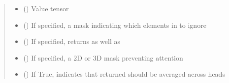 \documentclass[letterpaper,10pt,english]{sphinxmanual}
\begin{document}
\begin{fulllineitems}
\begin{fulllineitems}
\begin{quote}
\begin{description}
\begin{itemize}
\item {} 
\sphinxAtStartPar
{} () \textendash{} Value tensor

\item {} 
\sphinxAtStartPar
{} (\sphinxstyleliteralemphasis{\sphinxupquote{ (}}\sphinxstyleliteralemphasis{\sphinxupquote{)}}) \textendash{} If specified, a mask indicating which elements in  to ignore

\item {} 
\sphinxAtStartPar
{} (\sphinxstyleliteralemphasis{\sphinxupquote{ (}}\sphinxstyleliteralemphasis{\sphinxupquote{)}}) \textendash{} If specified, returns  as well as 

\item {} 
\sphinxAtStartPar
{} (\sphinxstyleliteralemphasis{\sphinxupquote{ (}}\sphinxstyleliteralemphasis{\sphinxupquote{)}}) \textendash{} If specified, a 2D or 3D mask preventing attention

\item {} 
\sphinxAtStartPar
{} (\sphinxstyleliteralemphasis{\sphinxupquote{ (}}\sphinxstyleliteralemphasis{\sphinxupquote{)}}) \textendash{} If True, indicates that returned  should be averaged across heads

\end{itemize}

\end{description}\end{quote}


\end{fulllineitems}
\end{fulllineitems}
\end{document}
